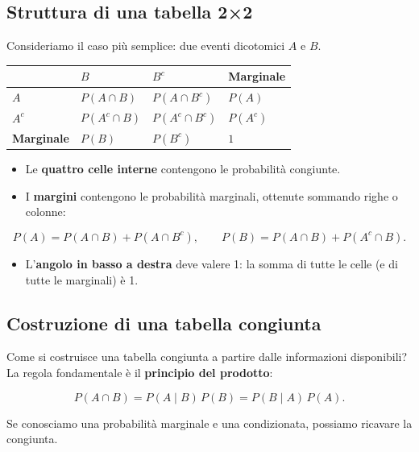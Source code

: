 \documentclass[
  italian,
  letterpaper,
  a4paper,
  11pt,
  open=any]{scrbook}
\newcounter{none} %
\providecommand{\tightlist}{%
  \setlength{\itemsep}{0pt}\setlength{\parskip}{0pt}}
\theoremstyle{plain}
\theoremstyle{definition}
\theoremstyle{definition}
\theoremstyle{remark}
\begin{document}
\subsection{Struttura di una tabella
2×2}\label{struttura-di-una-tabella-22}

Consideriamo il caso più semplice: due eventi dicotomici \(A\) e \(B\).

{\def\LTcaptype{none} %
\begin{longtable}[]{@{}llll@{}}
\toprule\noalign{}
& \(B\) & \(B^c\) & Marginale \\
\midrule\noalign{}
\endhead
\bottomrule\noalign{}
\endlastfoot
\(A\) & \(P(A \cap B)\) & \(P(A \cap B^c)\) & \(P(A)\) \\
\(A^c\) & \(P(A^c \cap B)\) & \(P(A^c \cap B^c)\) & \(P(A^c)\) \\
\textbf{Marginale} & \(P(B)\) & \(P(B^c)\) & \(1\) \\
\end{longtable}
}

\begin{itemize}
\tightlist
\item
  Le \textbf{quattro celle interne} contengono le probabilità congiunte.
\item
  I \textbf{margini} contengono le probabilità marginali, ottenute
  sommando righe o colonne:
\end{itemize}

\[P(A) = P(A \cap B) + P(A \cap B^c), \qquad P(B) = P(A \cap B) + P(A^c \cap B).\]

\begin{itemize}
\tightlist
\item
  L'\textbf{angolo in basso a destra} deve valere 1: la somma di tutte
  le celle (e di tutte le marginali) è 1.
\end{itemize}

\subsection{Costruzione di una tabella
congiunta}\label{costruzione-di-una-tabella-congiunta}

Come si costruisce una tabella congiunta a partire dalle informazioni
disponibili? La regola fondamentale è il \textbf{principio del
prodotto}:

\[P(A \cap B) = P(A \mid B) \, P(B) = P(B \mid A) \, P(A).\]

Se conosciamo una probabilità marginale e una condizionata, possiamo
ricavare la congiunta.
\end{document}
